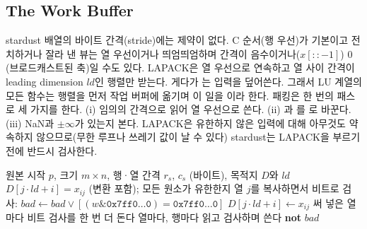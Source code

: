 \subsection{The Work Buffer}

stardust 배열의 바이트 간격(stride)에는 제약이 없다. C 순서(행 우선)가 기본이고 전치하거나 잘라 낸 뷰는 열 우선이거나 띄엄띄엄하며 간격이 음수이거나($x[::-1]$) $0$(브로드캐스트된 축)일 수도 있다. LAPACK은 열 우선으로 연속하고 열 사이 간격이 leading dimension $\mathit{ld}$인 행렬만 받는다. 게다가 는 입력을 덮어쓴다. 그래서 LU 계열의 모든 함수는 행렬을 먼저 작업 버퍼에 옮기며 이 일을 이라 한다. 패킹은 한 번의 패스로 세 가지를 한다. (i) 임의의 간격으로 읽어 열 우선으로 쓴다. (ii) 과 를 로 바꾼다. (iii) NaN과 $\pm\infty$가 있는지 본다. LAPACK은 유한하지 않은 입력에 대해 아무것도 약속하지 않으므로(무한 루프나 쓰레기 값이 날 수 있다) stardust는 LAPACK을 부르기 전에 반드시 검사한다.

\begin{algorithm}[htbp]
\begin{algorithmic}[1]
\Require 원본 시작 $p$, 크기 $m\times n$, 행·열 간격 $r_s$, $c_s$ (바이트), 목적지 $D$와 $\mathit{ld}$
\Ensure $D[j\cdot\mathit{ld}+i]=x_{ij}$ (변환 포함); 모든 원소가 유한한지
 
    \State 열 $j$를 복사하면서 비트로 검사: $\mathit{bad}\gets\mathit{bad}\lor[(w\mathbin{\&}\mathtt{0x7ff0\ldots0})=\mathtt{0x7ff0\ldots0}]$
  \EndFor
{} 
   
    \For{$j\in[j_0,j_0+32)$} \For{$i\in[i_0,i_0+32)$}
      \State $D[j\cdot\mathit{ld}+i]\gets x_{ij}$
    \EndFor\EndFor
  \EndFor\EndFor
  \State 써 넣은 열마다 비트 검사를 한 번 더 돈다
\Else {}
  \State 열마다, 행마다 읽고 검사하며 쓴다
\EndIf
\State \Return \textbf{not} $\mathit{bad}$
\end{algorithmic}
\caption{패킹 (stardust 의 세 경로, 실수 의 경우)}
\label{alg:lu-pack}
\end{algorithm}

